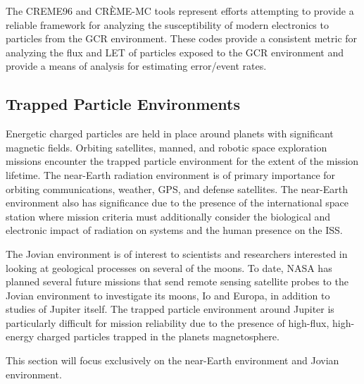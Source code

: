 The CREME96 and CR\`EME-MC tools represent efforts attempting to provide a reliable framework for analyzing the susceptibility of modern electronics to particles from the GCR environment.
These codes provide a consistent metric for analyzing the flux and LET of particles exposed to the GCR environment and provide a means of analysis for estimating error/event rates.

\subsection{Trapped Particle Environments} %
\label{sub:trapped_particle_environment}
Energetic charged particles are held in place around planets with significant magnetic fields.
Orbiting satellites, manned, and robotic space exploration missions encounter the trapped particle environment for the extent of the mission lifetime.
The near-Earth radiation environment is of primary importance for orbiting communications, weather, GPS, and defense satellites.
The near-Earth environment also has significance due to the presence of the international space station where mission criteria must additionally consider the biological and electronic impact of radiation on systems and the human presence on the ISS.

The Jovian environment is of interest to scientists and researchers interested in looking at geological processes on several of the moons.
To date, NASA has planned several future missions that send remote sensing satellite probes to the Jovian environment to investigate its moons, Io and Europa, in addition to studies of Jupiter itself.
The trapped particle environment around Jupiter is particularly difficult for mission reliability due to the presence of high-flux, high-energy charged particles trapped in the planets magnetosphere.

This section will focus exclusively on the near-Earth environment and Jovian environment.

